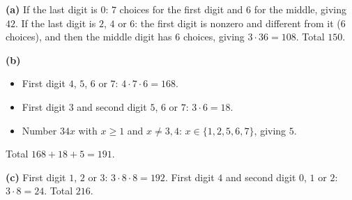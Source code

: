 \textbf{(a)} If the last digit is $0$: $7$ choices for the first digit and $6$ for the middle, giving $42$. If the last digit is $2$, $4$ or $6$: the first digit is nonzero and different from it ($6$ choices), and then the middle digit has $6$ choices, giving $3\cdot36=108$. Total $\boxed{150}$.

\textbf{(b)}
\begin{itemize}
\item First digit $4$, $5$, $6$ or $7$: $4\cdot7\cdot6=168$.
\item First digit $3$ and second digit $5$, $6$ or $7$: $3\cdot6=18$.
\item Number $34x$ with $x\ge1$ and $x\ne3,4$: $x\in\{1,2,5,6,7\}$, giving $5$.
\end{itemize}
Total $168+18+5=\boxed{191}$.

\textbf{(c)} First digit $1$, $2$ or $3$: $3\cdot8\cdot8=192$. First digit $4$ and second digit $0$, $1$ or $2$: $3\cdot8=24$. Total $\boxed{216}$.
